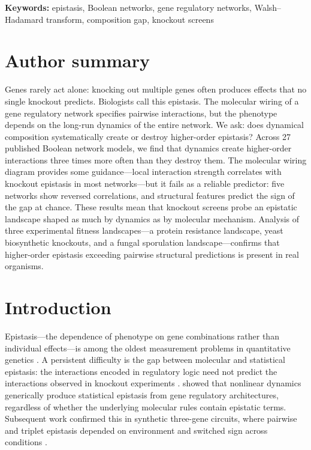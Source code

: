 \documentclass[10pt]{article}
\begin{document}
\noindent\textbf{Keywords:}
epistasis, Boolean networks, gene regulatory networks,
Walsh--Hadamard transform, composition gap, knockout screens


\section*{Author summary}
Genes rarely act alone: knocking out multiple genes often produces
effects that no single knockout predicts. Biologists call this epistasis.
The molecular wiring of a gene regulatory network specifies pairwise
interactions, but the phenotype depends on the long-run dynamics of the
entire network. We ask: does dynamical composition systematically create
or destroy higher-order epistasis? Across 27 published Boolean network
models, we find that dynamics create higher-order interactions three
times more often than they destroy them. The molecular wiring diagram
provides some guidance---local interaction strength correlates with
knockout epistasis in most networks---but it fails as a reliable
predictor: five networks show reversed correlations, and structural
features predict the sign of the gap at chance. These results mean
that knockout screens probe an epistatic landscape shaped as much by
dynamics as by molecular mechanism. Analysis of three experimental
fitness landscapes---a protein resistance landscape, yeast
biosynthetic knockouts, and a fungal sporulation landscape---confirms
that higher-order epistasis exceeding pairwise structural predictions
is present in real organisms.


\section{Introduction}
\label{sec:intro}

Epistasis---the dependence of phenotype on gene combinations rather
than individual effects---is among the oldest measurement problems in
quantitative genetics \citep{fisher1918correlation, bateson1909heredity}. A
persistent difficulty is the gap between molecular and statistical
epistasis: the interactions encoded in regulatory logic need not
predict the interactions observed in knockout experiments
\citep{phillips2008epistasis}. \citet{gjuvsland2007statistical} showed
that nonlinear dynamics generically produce statistical epistasis from
gene regulatory architectures, regardless of whether the underlying
molecular rules contain epistatic terms. Subsequent work confirmed this in synthetic three-gene
circuits, where pairwise and triplet epistasis depended on environment
and switched sign across conditions \citep{baier2023environment}.
\end{document}
